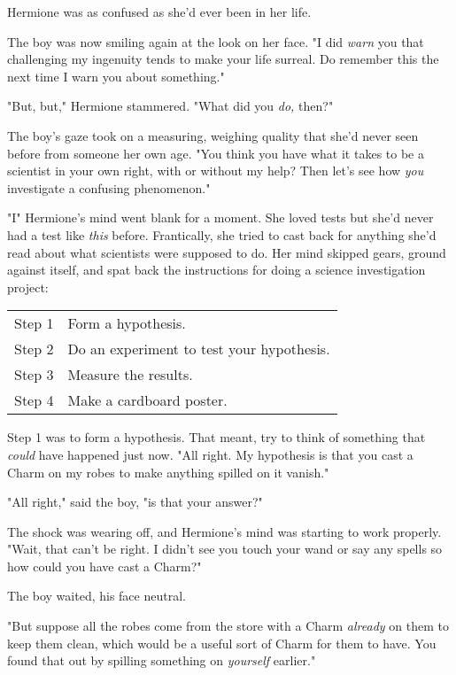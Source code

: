 Hermione was as confused as she'd ever been in her life.

The boy was now smiling again at the look on her face. "I did \emph{warn} you
that challenging my ingenuity tends to make your life surreal. Do remember this
the next time I warn you about something."

"But, but," Hermione stammered. "What did you \emph{do,} then?"

The boy's gaze took on a measuring, weighing quality that she'd never seen
before from someone her own age. "You think you have what it takes to be a
scientist in your own right, with or without my help? Then let's see how
\emph{you} investigate a confusing phenomenon."

"I{\el}" Hermione's mind went blank for a moment. She loved tests but she'd
never had a test like \emph{this} before. Frantically, she tried to cast back
for anything she'd read about what scientists were supposed to do. Her mind
skipped gears, ground against itself, and spat back the instructions for doing
a science investigation project:

\begin{center}
    \itshape
    \begin{tabular}[t]{r@{: }l}
        Step 1 & Form a hypothesis.\\
        Step 2 & Do an experiment to test your hypothesis.\\
        Step 3 & Measure the results.\\
        Step 4 & Make a cardboard poster.
    \end{tabular}
\end{center}

Step 1 was to form a hypothesis. That meant, try to think of something that
\emph{could} have happened just now. "All right. My hypothesis is that you cast
a Charm on my robes to make anything spilled on it vanish."

"All right," said the boy, "is that your answer?"

The shock was wearing off, and Hermione's mind was starting to work properly.
"Wait, that can't be right. I didn't see you touch your wand or say any spells
so how could you have cast a Charm?"

The boy waited, his face neutral.

"But suppose all the robes come from the store with a Charm \emph{already} on
them to keep them clean, which would be a useful sort of Charm for them to
have. You found that out by spilling something on \emph{yourself} earlier."

